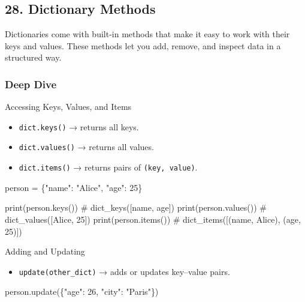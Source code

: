 \documentclass[
  letterpaper,
  DIV=11,
  numbers=noendperiod]{scrreprt}
\newenvironment{Shaded}{\begin{snugshade}}{\end{snugshade}}
\newcommand{\BuiltInTok}[1]{\textcolor[rgb]{0.00,0.23,0.31}{#1}}
\newcommand{\CommentTok}[1]{\textcolor[rgb]{0.37,0.37,0.37}{#1}}
\newcommand{\DecValTok}[1]{\textcolor[rgb]{0.68,0.00,0.00}{#1}}
\newcommand{\NormalTok}[1]{\textcolor[rgb]{0.00,0.23,0.31}{#1}}
\newcommand{\OperatorTok}[1]{\textcolor[rgb]{0.37,0.37,0.37}{#1}}
\newcommand{\StringTok}[1]{\textcolor[rgb]{0.13,0.47,0.30}{#1}}
\providecommand{\tightlist}{%
  \setlength{\itemsep}{0pt}\setlength{\parskip}{0pt}}
\begin{document}
\subsection{28. Dictionary Methods}\label{dictionary-methods}

Dictionaries come with built-in methods that make it easy to work with
their keys and values. These methods let you add, remove, and inspect
data in a structured way.

\subsubsection{Deep Dive}\label{deep-dive-28}

Accessing Keys, Values, and Items

\begin{itemize}
\tightlist
\item
  \texttt{dict.keys()} → returns all keys.
\item
  \texttt{dict.values()} → returns all values.
\item
  \texttt{dict.items()} → returns pairs of \texttt{(key,\ value)}.
\end{itemize}

\begin{Shaded}
\begin{Highlighting}[]
\NormalTok{person }\OperatorTok{=}\NormalTok{ \{}\StringTok{"name"}\NormalTok{: }\StringTok{"Alice"}\NormalTok{, }\StringTok{"age"}\NormalTok{: }\DecValTok{25}\NormalTok{\}}

\BuiltInTok{print}\NormalTok{(person.keys())    }\CommentTok{\# dict\_keys([\textquotesingle{}name\textquotesingle{}, \textquotesingle{}age\textquotesingle{}])}
\BuiltInTok{print}\NormalTok{(person.values())  }\CommentTok{\# dict\_values([\textquotesingle{}Alice\textquotesingle{}, 25])}
\BuiltInTok{print}\NormalTok{(person.items())   }\CommentTok{\# dict\_items([(\textquotesingle{}name\textquotesingle{}, \textquotesingle{}Alice\textquotesingle{}), (\textquotesingle{}age\textquotesingle{}, 25)])}
\end{Highlighting}
\end{Shaded}

Adding and Updating

\begin{itemize}
\tightlist
\item
  \texttt{update(other\_dict)} → adds or updates key--value pairs.
\end{itemize}

\begin{Shaded}
\begin{Highlighting}[]
\NormalTok{person.update(\{}\StringTok{"age"}\NormalTok{: }\DecValTok{26}\NormalTok{, }\StringTok{"city"}\NormalTok{: }\StringTok{"Paris"}\NormalTok{\})}
\end{Highlighting}
\end{Shaded}
\end{document}
